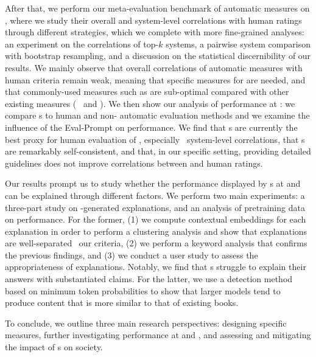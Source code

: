 After that, we perform our meta-evaluation benchmark of automatic measures on {\hanna}, where we study their overall and system-level correlations with human ratings through different strategies, which we complete with more fine-grained analyses: an experiment on the correlations of top-$k$ systems, a pairwise system comparison with bootstrap resampling, and a discussion on the statistical discernibility of our results. We mainly observe that overall correlations of automatic measures with human criteria remain weak, meaning that specific measures for {\ase} are needed, and that commonly-used measures such as {\bleu} are sub-optimal compared with other existing measures ({\eg}\ {\bertscore} and {\bartscore}). We then show our analysis of {\llm} performance at {\ase}: we compare {\llm}s to human and non-{\llm} automatic evaluation methods and we examine the influence of the Eval-Prompt on {\llm} performance. We find that {\llm}s are currently the best proxy for human evaluation of {\asg}, especially {\wrt}\ system-level correlations, that {\llm}s are remarkably self-consistent, and that, in our specific setting, providing detailed guidelines does not improve correlations between {\llm} and human ratings.

Our results prompt us to study whether the performance displayed by {\llm}s at {\ase} and {\asg} can be explained through different factors. We perform two main experiments: a three-part study on {\llm}-generated explanations, and an analysis of pretraining data on {\llm} performance. For the former, (1) we compute contextual embeddings for each {\llm} explanation in order to perform a clustering analysis and show that explanations are well-separated {\wrt}\ our criteria, (2) we perform a keyword analysis that confirms the previous findings, and (3) we conduct a user study to assess the appropriateness of {\llm} explanations. Notably, we find that {\llm}s struggle to explain their answers with substantiated claims. For the latter, we use a detection method based on minimum token probabilities to show that larger models tend to produce content that is more similar to that of existing books.

To conclude, we outline three main research perspectives: designing specific {\ase} measures, further investigating {\llm} performance at {\asg} and {\ase}, and assessing and mitigating the impact of {\llm}s on society.